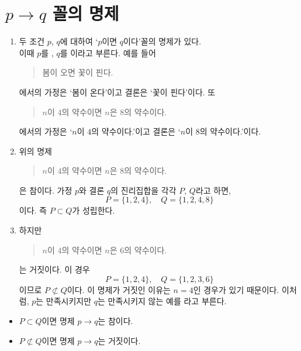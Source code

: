 \documentclass{oblivoir}
\begin{document}
\section{\(p\to q\) 꼴의 명제}

%
\exam{}
\begin{enumerate}\label{pq1}
\item
두 조건 \(p\), \(q\)에 대하여 `\(p\)이면 \(q\)이다’꼴의 명제가 있다.\\
이때 \(p\)를 , \(q\)를 이라고 부른다.
예를 들어
\begin{quote}
봄이 오면 꽃이 핀다.
\end{quote}
에서의 가정은 `봄이 온다’이고 결론은 `꽃이 핀다’이다.
또
\begin{quote}
\(n\)이 \(4\)의 약수이면 \(n\)은 \(8\)의 약수이다.
\end{quote}
에서의 가정은 `\(n\)이 \(4\)의 약수이다.’이고 결론은 `\(n\)이 \(8\)의 약수이다.’이다.
\item
위의 명제
\begin{quote}
\(n\)이 \(4\)의 약수이면 \(n\)은 \(8\)의 약수이다.
\end{quote}
은 참이다.
가정 \(p\)와 결론 \(q\)의 진리집합을 각각 \(P\), \(Q\)라고 하면,
\[P=\{1,2,4\},\quad Q=\{1,2,4,8\}\]
이다.
즉 \(P\subset Q\)가 성립한다.
\item
하지만
\begin{quote}
\(n\)이 \(4\)의 약수이면 \(n\)은 \(6\)의 약수이다.
\end{quote}
는 거짓이다.
이 경우
\[P=\{1,2,4\},\quad Q=\{1,2,3,6\}\]
이므로 \(P\not\subset Q\)이다.
이 명제가 거짓인 이유는 \(n=4\)인 경우가 있기 때문이다.
이처럼, \(p\)는 만족시키지만 \(q\)는 만족시키지 않는 예를 라고 부른다.\footnotemark
{}
\end{enumerate}

\begin{mdframed}
%
\theo{}
\begin{itemize}\label{pq2}
\item
\(P\subset Q\)이면 명제 \(p\to q\)는 참이다.
\item
\(P\not\subset Q\)이면 명제 \(p\to q\)는 거짓이다.%
\end{itemize}
\end{mdframed}
\end{document}
